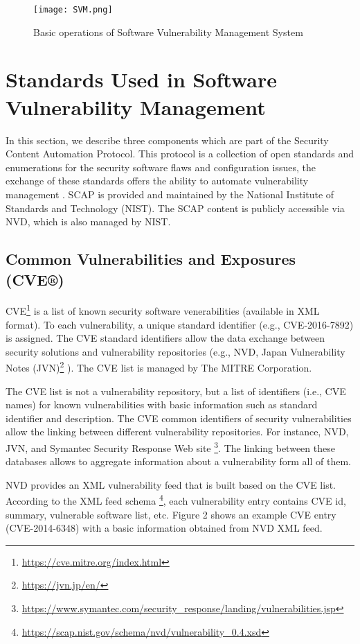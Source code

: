 \documentclass{llncs}
\begin{document}
\begin{figure}
 
  \centering
    \texttt{[image: SVM.png]}
     \caption{Basic operations of Software Vulnerability Management System}
\end{figure}

\section{Standards	Used	in	Software	Vulnerability	Management}
 
 In	this section, we describe three	components which are part of the Security	 Content	Automation	Protocol. This protocol is a collection of open standards and enumerations for the	security  software flaws	 and configuration issues, the exchange of these	standards	offers	the	ability	to	automate	vulnerability	management \cite{scap_doc}.		
 SCAP is provided	and	maintained	by	the	National	Institute	of	Standards	and	Technology (NIST). The SCAP	content	is	publicly accessible via  NVD, which is also managed	by NIST.
 
 
 \subsection{Common Vulnerabilities and Exposures (CVE®)} 
 CVE\footnote{\url{https://cve.mitre.org/index.html}} is a list of known security software venerabilities (available in XML format). To each vulnerability, a unique standard identifier (e.g., CVE-2016-7892) is assigned. The CVE standard identifiers allow the data exchange between security solutions and vulnerability repositories (e.g., NVD, Japan Vulnerability Notes (JVN)\footnote{\url{https://jvn.jp/en/}} ). The CVE list is managed by The MITRE Corporation.

 The CVE list is not a vulnerability repository, but a list of identifiers (i.e., CVE names) for  known vulnerabilities with basic information such as standard identifier and description. The CVE common identifiers of security vulnerabilities allow the linking between different vulnerability repositories. For instance, NVD, JVN, and Symantec Security Response Web site \footnote{\url{https://www.symantec.com/security_response/landing/vulnerabilities.jsp}}. The linking between these databases allows to aggregate information about a vulnerability form all of them. 
 
 NVD provides an XML vulnerability feed that is built based on the CVE list. According to the XML feed schema \footnote{\url{https://scap.nist.gov/schema/nvd/vulnerability_0.4.xsd}}, each vulnerability entry contains CVE id, summary, vulnerable software list, etc. Figure 2 shows an example CVE entry (CVE-2014-6348) with a basic information obtained from NVD XML feed.
\end{document}
